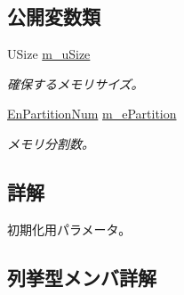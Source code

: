 \subsection*{公開変数類}
\begin{DoxyCompactItemize}
\item 
U\+Size \hyperlink{struct_c_mem_allocator_1_1_st_init_param_a27002d26b5ccf62e8588984954f01bd9}{m\+\_\+u\+Size}
\begin{DoxyCompactList}\small\item\em 確保するメモリサイズ。 \end{DoxyCompactList}\item 
\hyperlink{struct_c_mem_allocator_1_1_st_init_param_a955c7d57350b1dcd81384b4d840f7640}{En\+Partition\+Num} \hyperlink{struct_c_mem_allocator_1_1_st_init_param_acf563f108b9d517ac97622d915eaa08d}{m\+\_\+e\+Partition}
\begin{DoxyCompactList}\small\item\em メモリ分割数。 \end{DoxyCompactList}\end{DoxyCompactItemize}


\subsection{詳解}
初期化用パラメータ。 

\subsection{列挙型メンバ詳解}
\hypertarget{struct_c_mem_allocator_1_1_st_init_param_a955c7d57350b1dcd81384b4d840f7640}{}
